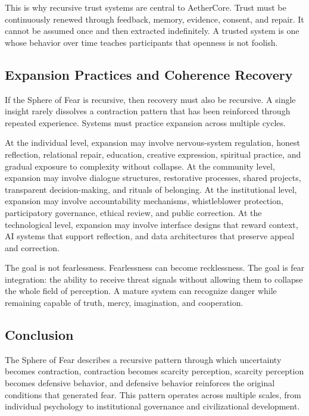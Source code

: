 \documentclass[12pt]{article}
\begin{document}
This is why recursive trust systems are central to AetherCore. Trust must be continuously renewed through feedback, memory, evidence, consent, and repair. It cannot be assumed once and then extracted indefinitely. A trusted system is one whose behavior over time teaches participants that openness is not foolish.

\subsection{Expansion Practices and Coherence Recovery}

If the Sphere of Fear is recursive, then recovery must also be recursive. A single insight rarely dissolves a contraction pattern that has been reinforced through repeated experience. Systems must practice expansion across multiple cycles.

At the individual level, expansion may involve nervous-system regulation, honest reflection, relational repair, education, creative expression, spiritual practice, and gradual exposure to complexity without collapse. At the community level, expansion may involve dialogue structures, restorative processes, shared projects, transparent decision-making, and rituals of belonging. At the institutional level, expansion may involve accountability mechanisms, whistleblower protection, participatory governance, ethical review, and public correction. At the technological level, expansion may involve interface designs that reward context, AI systems that support reflection, and data architectures that preserve appeal and correction.

The goal is not fearlessness. Fearlessness can become recklessness. The goal is fear integration: the ability to receive threat signals without allowing them to collapse the whole field of perception. A mature system can recognize danger while remaining capable of truth, mercy, imagination, and cooperation.

\subsection{Conclusion}

The Sphere of Fear describes a recursive pattern through which uncertainty becomes contraction, contraction becomes scarcity perception, scarcity perception becomes defensive behavior, and defensive behavior reinforces the original conditions that generated fear. This pattern operates across multiple scales, from individual psychology to institutional governance and civilizational development.
\end{document}
